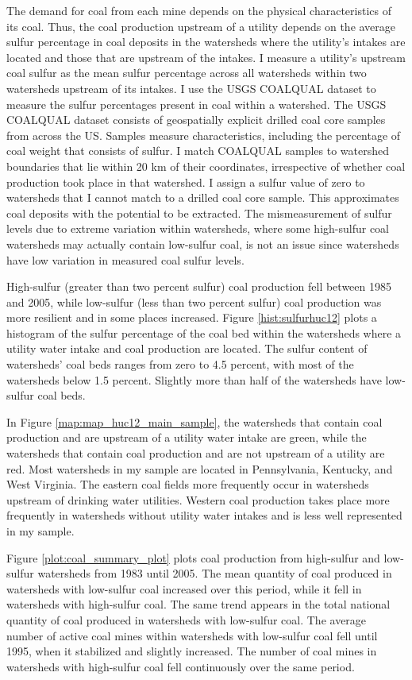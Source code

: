 \documentclass[12pt]{article}
\begin{document}
The demand for coal from each mine depends on the physical characteristics of its coal. Thus, the coal production upstream of a utility depends on the average sulfur percentage in coal deposits in the watersheds where the utility's intakes are located and those that are upstream of the intakes. I measure a utility's upstream coal sulfur as the mean sulfur percentage across all watersheds within two watersheds upstream of its intakes. I use the USGS COALQUAL dataset to measure the sulfur percentages present in coal within a watershed. The USGS COALQUAL dataset consists of geospatially explicit drilled coal core samples from across the US. Samples measure characteristics, including the percentage of coal weight that consists of sulfur. I match COALQUAL samples to watershed boundaries that lie within 20 km of their coordinates, irrespective of whether coal production took place in that watershed. I assign a sulfur value of zero to watersheds that I cannot match to a drilled coal core sample. This approximates coal deposits with the potential to be extracted. The mismeasurement of sulfur levels due to extreme variation within watersheds, where some high-sulfur coal watersheds may actually contain low-sulfur coal, is not an issue since watersheds have low variation in measured coal sulfur levels.

High-sulfur (greater than two percent sulfur) coal production fell between 1985 and 2005, while low-sulfur (less than two percent sulfur) coal production was more resilient and in some places increased. Figure \ref{hist:sulfurhuc12} plots a histogram of the sulfur percentage of the coal bed within the watersheds where a utility water intake and coal production are located. The sulfur content of watersheds' coal beds ranges from zero to 4.5 percent, with most of the watersheds below 1.5 percent. Slightly more than half of the watersheds have low-sulfur coal beds.  

In Figure \ref{map:map_huc12_main_sample}, the watersheds that contain coal production and are upstream of a utility water intake are green, while the watersheds that contain coal production and are not upstream of a utility are red. Most watersheds in my sample are located in Pennsylvania, Kentucky, and West Virginia. The eastern coal fields more frequently occur in watersheds upstream of drinking water utilities. Western coal production takes place more frequently in watersheds without utility water intakes and is less well represented in my sample.

Figure \ref{plot:coal_summary_plot} plots coal production from high-sulfur and low-sulfur watersheds from 1983 until 2005. The mean quantity of coal produced in watersheds with low-sulfur coal increased over this period, while it fell in watersheds with high-sulfur coal. The same trend appears in the total national quantity of coal produced in watersheds with low-sulfur coal. The average number of active coal mines within watersheds with low-sulfur coal fell until 1995, when it stabilized and slightly increased. The number of coal mines in watersheds with high-sulfur coal fell continuously over the same period.
\end{document}
